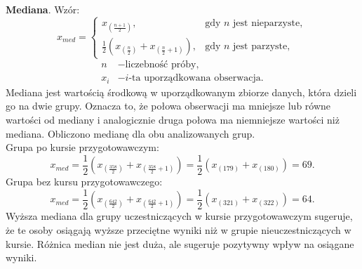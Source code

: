 \documentclass[12pt, a4paper]{article}
\begin{document}
	\textbf{Mediana}. Wzór:
	\[x_{med}=
	\begin{cases}
		x_{\left(\frac{n+1}{2}\right)}, & \text{gdy } n \text{ jest nieparzyste},\\[6pt]
		\frac{1}{2}\left(x_{\left(\frac{n}{2}\right)}+x_{\left(\frac{n}{2}+1\right)}\right), & \text{gdy } n \text{ jest parzyste},
	\end{cases}\]
	\[
	\begin{aligned}
		n &- \text{liczebność próby},\\
		x_i &- \text{$i$-ta uporządkowana obserwacja.}
	\end{aligned}
	\]
	Mediana jest wartością środkową w uporządkowanym zbiorze danych, która dzieli go na dwie grupy. Oznacza to, że połowa obserwacji ma mniejsze lub równe wartości od mediany i analogicznie druga połowa ma niemniejsze wartości niż mediana. Obliczono medianę dla obu analizowanych grup.\\
	Grupa po kursie przygotowawczym:\\
	\[x_{med}=
	\frac{1}{2}\left(x_{\left(\frac{358}{2}\right)}+x_{\left(\frac{358}{2}+1\right)}\right)=\frac{1}{2}\left(x_{(179)}+x_{(180)}\right)=69.
	\]
	Grupa bez kursu przygotowawczego:\\
	\[x_{med}=
	\frac{1}{2}\left(x_{\left(\frac{642}{2}\right)}+x_{\left(\frac{642}{2}+1\right)}\right)=\frac{1}{2}\left(x_{(321)}+x_{(322)}\right)=64.
	\]
	Wyższa mediana dla grupy uczestniczących w kursie przygotowawczym sugeruje, że te osoby osiągają wyższe przeciętne wyniki niż w grupie nieuczestniczących w kursie. Różnica median nie jest duża, ale sugeruje pozytywny wpływ na osiągane wyniki. \\
	
\end{document}
